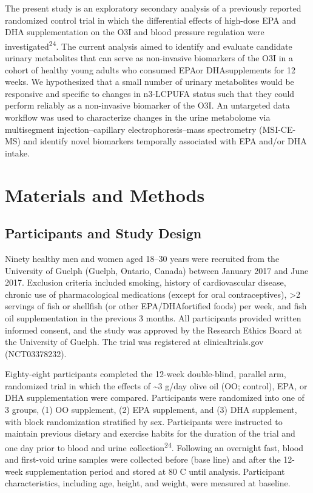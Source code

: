 \documentclass[journal=jacsat,manuscript=article]{achemso}
\begin{document}
The present study is an exploratory secondary analysis of a previously
reported randomized control trial in which the differential effects of
high-dose EPA and DHA supplementation on the O3I and blood pressure
regulation were investigated\textsuperscript{24}. The current analysis
aimed to identify and evaluate candidate urinary metabolites that can
serve as non-invasive biomarkers of the O3I in a cohort of healthy young
adults who consumed EPAor DHAsupplements for 12 weeks. We hypothesized
that a small number of urinary metabolites would be responsive and
specific to changes in n3-LCPUFA status such that they could perform
reliably as a non-invasive biomarker of the O3I. An untargeted data
workflow was used to characterize changes in the urine metabolome via
multisegment injection--capillary electrophoresis--mass spectrometry
(MSI-CE-MS) and identify novel biomarkers temporally associated with EPA
and/or DHA intake.

\section{Materials and Methods}\label{materials-and-methods}

\subsection{Participants and Study
Design}\label{participants-and-study-design}

Ninety healthy men and women aged 18--30 years were recruited from the
University of Guelph (Guelph, Ontario, Canada) between January 2017 and
June 2017. Exclusion criteria included smoking, history of
cardiovascular disease, chronic use of pharmacological medications
(except for oral contraceptives), \textgreater2 servings of fish or
shellfish (or other EPA/DHAfortified foods) per week, and fish oil
supplementation in the previous 3 months. All participants provided
written informed consent, and the study was approved by the Research
Ethics Board at the University of Guelph. The trial was registered at
clinicaltrials.gov (NCT03378232).

Eighty-eight participants completed the 12-week double-blind, parallel
arm, randomized trial in which the effects of \textasciitilde3 g/day
olive oil (OO; control), EPA, or DHA supplementation were compared.
Participants were randomized into one of 3 groups, (1) OO supplement,
(2) EPA supplement, and (3) DHA supplement, with block randomization
stratified by sex. Participants were instructed to maintain previous
dietary and exercise habits for the duration of the trial and one day
prior to blood and urine collection\textsuperscript{24}. Following an
overnight fast, blood and first-void urine samples were collected before
(base line) and after the 12-week supplementation period and stored at
80 C until analysis. Participant characteristics, including age, height,
and weight, were measured at baseline.
\end{document}
